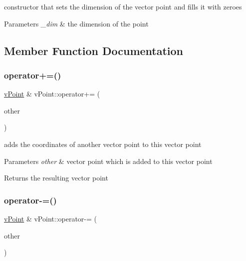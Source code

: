 constructor that sets the dimension of the vector point and fills it with zeroes 
\begin{DoxyParams}{Parameters}
{\em \+\_\+dim} & the dimension of the point \\
\hline
\end{DoxyParams}


\subsection{Member Function Documentation}
\mbox{\label{classv_point_ad0a97769619fe728547c474f856bbd66}} 
\subsubsection{\texorpdfstring{operator+=()}{operator+=()}}
{\footnotesize\ttfamily \hyperlink{classv_point}{v\+Point} \& v\+Point\+::operator+= (\begin{DoxyParamCaption}\item[{const \hyperlink{classv_point}{v\+Point} \&}]{other }\end{DoxyParamCaption})}

adds the coordinates of another vector point to this vector point 
\begin{DoxyParams}{Parameters}
{\em other} & vector point which is added to this vector point \\
\hline
\end{DoxyParams}
\begin{DoxyReturn}{Returns}
the resulting vector point 
\end{DoxyReturn}
\mbox{\label{classv_point_a3497af6c905c256e25fda5e0815bef56}} 
\subsubsection{\texorpdfstring{operator-\/=()}{operator-=()}}
{\footnotesize\ttfamily \hyperlink{classv_point}{v\+Point} \& v\+Point\+::operator-\/= (\begin{DoxyParamCaption}\item[{const \hyperlink{classv_point}{v\+Point} \&}]{other }\end{DoxyParamCaption})}

